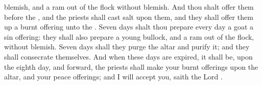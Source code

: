 {blemish, and a
ram out of the
flock without
blemish.
And thou shalt
offer them
before the
{}, and the
priests shall
cast
salt upon them, and they shall offer them
up
{} a burnt
offering unto the
{}.
Seven
days shalt thou
prepare every
day a
goat
{} a sin
offering: they shall also
prepare a
young
bullock, and a
ram out of the
flock, without
blemish.
Seven
days shall they
purge the
altar and
purify it; and they shall consecrate
themselves.
And when these
days are
expired, it shall be,
{} upon the
eighth
day, and
{}
forward, the
priests shall
make your burnt
offerings upon the
altar, and your peace
offerings; and I will
accept you,
saith the
Lord
{}.

}
